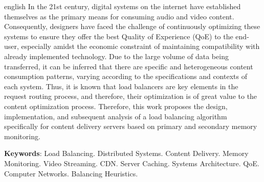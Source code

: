 
\begin{resumo}[Abstract]
 \begin{otherlanguage*}{english}
In the 21st century, digital systems on the internet have established themselves as the primary means for consuming audio and video content.
%
Consequently, designers have faced the challenge of continuously optimizing these systems to ensure they offer the best Quality of Experience (QoE) to the end-user, especially amidst the economic constraint of maintaining compatibility with already implemented technology.
%
Due to the large volume of data being transferred, it can be inferred that there are specific and heterogeneous content consumption patterns, varying according to the specifications and contexts of each system.
%
Thus, it is known that load balancers are key elements in the request routing process, and therefore, their optimization is of great value to the content optimization process.
%
Therefore, this work proposes the design, implementation, and subsequent analysis of a load balancing algorithm specifically for content delivery servers based on primary and secondary memory monitoring.

 \textbf{Keywords}:
 Load Balancing.
 Distributed Systems.
 Content Delivery.
 Memory Monitoring.
 Video Streaming.
 CDN.
 Server Caching.
 Systems Architecture.
 QoE.
 Computer Networks.
 Balancing Heuristics.
 \end{otherlanguage*}
\end{resumo}
